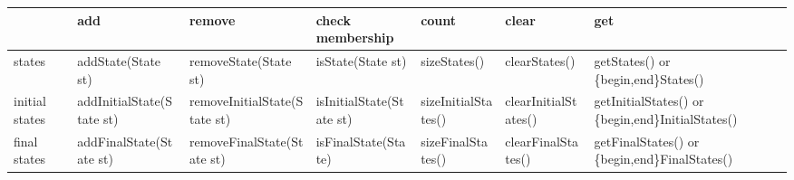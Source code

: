 \begin{sidewaystable}\sffamily\footnotesize
\begin{threeparttable}
\label{Ta:simple-functions}
\begin{tabular}{p{0.55in}p{1.40in}p{1.45in}p{1.2in}p{1.12in}p{1.05in}p{1.35in}}
\toprule
                 &  add\tnote{1}                            &  remove\tnote{1}                          &  check membership\tnote{2} &  count                &  clear                     &  get\tnote{3}                 \\
\hline\hline %
states           &  addState(State st)                      &  removeState(State st)\tnote{4}           &  isState(State st)         &  sizeStates()         &  clearStates()\tnote{4}    &  getStates() or \newline
                                                                                                                                                                                             \{begin,end\}States()        \\
initial \newline
states           &  addInitialState(State st)               &  removeInitialState(State st)             &  isInitialState(State st)  &  sizeInitialStates()  &  clearInitialStates()      &  getInitialStates() or \newline
                                                                                                                                                                                             \{begin,end\}InitialStates() \\
final
\newline  states &  addFinalState(State st)                 &  removeFinalState(State st)               &  isFinalState(State)       &  sizeFinalStates()    &  clearFinalStates()        &  getFinalStates() or \newline
                                                                                                                                                                                             \{begin,end\}FinalStates()    \\
\hline %

\end{tabular}
\end{threeparttable}
\end{sidewaystable}
